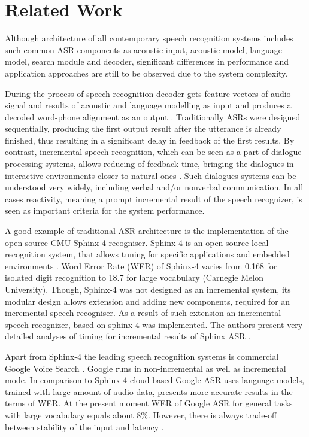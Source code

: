 \chapter {Related Work}
\label{ch:relatedWork}
Although architecture of  all contemporary speech recognition systems includes
such common ASR components as acoustic input, acoustic model, language model,
search module and decoder, significant differences in performance and 
application approaches are still to be observed due to the system complexity. 


During the process of speech recognition decoder gets feature vectors of audio
signal and results of acoustic and language modelling as input and produces
a decoded word-phone alignment as an output \parencite {jurafskymartin2009}.
Traditionally ASRs were designed sequentially, producing the first output result
after the utterance is already finished, thus resulting in a significant delay
in feedback of the first results. By contrast, incremental speech recognition,
which can be seen as a part of dialogue processing systems, allows reducing of feedback time, bringing the dialogues in interactive
environments closer to natural ones \parencite {skantzeschlangen2009}. 
Such dialogues systems can be understood very widely, including verbal and/or
nonverbal communication. In all cases reactivity, meaning a prompt
incremental result of the speech recognizer, is seen as important criteria for
the system performance. 

A good example of  traditional ASR architecture is the implementation of the
open-source CMU Sphinx-4 recogniser. Sphinx-4 is an open-source local
recognition system, that allows tuning for specific applications and embedded
environments \parencite
{Lamereetal2013:Eurospeech}.  Word Error Rate (WER) of Sphinx-4 varies from 0.168 for isolated
digit recognition to 18.7 for large vocabulary (Carnegie Melon University).
Though, Sphinx-4 was not designed as an incremental system, its modular design allows extension and adding new components, required 
for an incremental speech recogniser. As a result of such extension an
incremental speech recognizer, based on sphinx-4 was implemented. The authors present very detailed analyses of timing for
incremental results of Sphinx ASR \parencite {baumannetal2009:naacl}.

Apart from Sphinx-4 the leading speech recognition systems is commercial
Google Voice Search \parencite{schalkwyk2010}. Google runs in non-incremental as
well as incremental mode. In comparison to Sphinx-4  cloud-based Google ASR uses
language models, trained with  large amount of audio data, presents more
accurate results in the terms of WER. At the present moment WER of Google ASR for general tasks
with large vocabulary equals about 8\%. However, there is always trade-off
between stability of the input and latency \parencite {mcgrawgrauenstein2012}.

